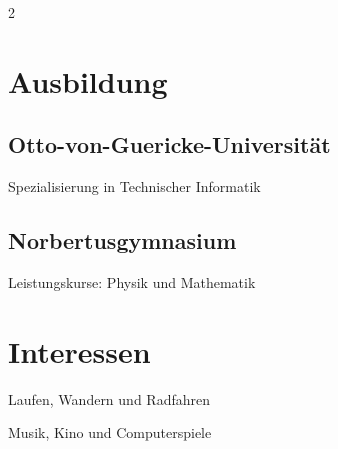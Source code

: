 \begin{paracol}{2}
\section{Ausbildung}
\subsection{Otto-von-Guericke-Universität}
Spezialisierung in Technischer Informatik \\
\sectionsep

\subsection{Norbertusgymnasium}
Leistungskurse: Physik und Mathematik
\sectionsep


\section{Interessen}
\begin{tightemize}
\item Laufen, Wandern und Radfahren
\item Musik, Kino und Computerspiele
\end{tightemize}

\end{paracol}
